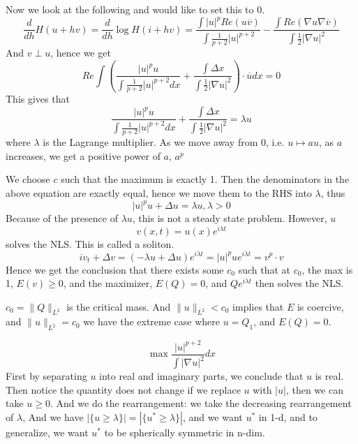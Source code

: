 Now we look at the following and would like to set this to 0.
\begin{equation*}
    \frac{d}{dh}H(u+hv)=\frac{d}{dh}\log H(i+hv)=\frac{\int |u|^pRe(u\overline{v})}{\int\frac{1}{p+2}|u|^{p+2}}-\frac{\int Re(\nabla u\nabla \overline{v})}{\int\frac{1}{2}|\nabla u|^2}
\end{equation*}
And $v\perp u$, hence we get 
\begin{equation*}
    Re\int \left(\frac{|u|^pu}{\int\frac{1}{p+2}|u|^{p+2}dx}+\frac{\int\Delta x}{\int\frac{1}{2}|\nabla u|^2} \right)\cdot\overline{u}dx=0
\end{equation*}
This gives that
\begin{equation*}
    \frac{|u|^pu}{\int\frac{1}{p+2}|u|^{p+2}dx}+\frac{\int\Delta x}{\int\frac{1}{2}|\nabla u|^2}=\lambda u
\end{equation*}
where $\lambda$ is the Lagrange multiplier. As we move away from 0, i.e. $u\mapsto au$, as $a$ increases, we get a positive power of $a$, $a^p$

We choose $c$ such that the maximum is exactly 1. Then the denominators in the above equation are exactly equal, hence we move them to the RHS into $\lambda$, thus
\begin{equation*}
    |u|^pu+\Delta u=\lambda u, \lambda>0
\end{equation*}
Because of the presence of $\lambda u$, this is not a steady state problem. However, $u$
\begin{equation*}
    v(x,t)=u(x)e^{i\lambda t}
\end{equation*}
solves the NLS. This is called a soliton.
\begin{equation*}
    iv_t+\Delta v=(-\lambda u+\Delta u)e^{i\lambda t}=|u|^p ue^{i\lambda t}=v^p\cdot v
\end{equation*}
Hence we get the conclusion that there exists some $c_0$ such that at $c_0$, the max is 1, $E(v)\geq 0$, and the maximizer, $E(Q)=0$, and $Qe^{i\lambda t}$ then solves the NLS.

\begin{proposition}
    $c_0=\|Q\|_{L^2}$ is the critical mass. And $\|u\|_{L^2}< c_0$ implies that $E$ is coercive, and $\|u\|_{L^2}=c_0$ we have the extreme case where $u=Q_1$, and $E(Q)=0$. 
\end{proposition}
\begin{equation*}
    \max\frac{|u|^{p+2}}{\int|\nabla u|^2}dx
\end{equation*}
First by separating $u$ into real and imaginary parts, we conclude that $u$ is real. Then notice the quantity does not change if we replace $u$ with $|u|$, then we can take $u\geq 0$. And we do the rearrangement: we take the decreasing rearrangement of $\lambda$, And we have $|\{u\geq\lambda\}|=|\{u^*\geq\lambda\}|$, and we want $u^*$ in 1-d, and to generalize, we want $u^*$ to be spherically symmetric in n-dim.

